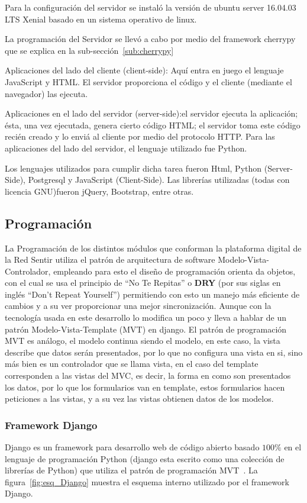 \documentclass[journal,transmag]{IEEEtran}
\begin{document}
Para la configuración del servidor se instaló la versión de ubuntu server 16.04.03 LTS Xenial basado en un sistema operativo de linux.

La programación del Servidor se llevó a cabo por medio del framework cherrypy que se explica en la sub-sección~\ref{sub:cherrypy}

Aplicaciones del lado del cliente (client-side): Aquí entra en juego el lenguaje JavaScript y HTML. El servidor proporciona el código y el cliente (mediante el navegador) las ejecuta. 

Aplicaciones en el lado del servidor (server-side):el servidor ejecuta la aplicación; ésta, una vez ejecutada, genera cierto código HTML; el servidor toma este código recién creado y lo enviá al cliente por medio del protocolo HTTP. Para las aplicaciones del lado del servidor, el lenguaje utilizado fue  Python.

Los lenguajes utilizados para cumplir dicha tarea fueron Html, Python (Server-Side), Postgresql y JavaScript (Client-Side). Las librerías utilizadas (todas con licencia GNU)fueron jQuery, Bootstrap, entre otras.

\subsection{Programación}
La Programación de los distintos módulos que conforman la plataforma digital de la Red Sentir utiliza el patrón de arquitectura de software Modelo-Vista-Controlador, empleando para esto el diseño de programación orienta da objetos, con el cual se usa el principio de ``No Te Repitas'' o \textbf{DRY} (por sus siglas en inglés ``Don't Repeat Yourself'') permitiendo con esto un manejo más eficiente de cambios y a su ver proporcionar una mejor sincronización. Aunque con la tecnología usada en este desarrollo lo modifica un poco y lleva a hablar de un patrón Modelo-Vista-Template (MVT) en django. El patrón de programación MVT es análogo, el modelo continua siendo el modelo, en este caso, la vista describe que datos serán presentados, por lo que no configura una vista en si, sino más bien es un controlador que se llama vista, en el caso del template corresponden a las vistas del MVC, es decir, la forma en como son presentados los datos, por lo que los formularios van en template, estos formularios hacen peticiones a las vistas, y a su vez las vistas obtienen datos de los modelos.

\subsubsection{Framework Django}
Django es un framework para desarrollo web de código abierto basado $100\%$ en el lenguaje de programación Python (django esta escrito como una colección de librerías de Python) que utiliza el patrón de programación MVT~\cite{Hol2009, DjangoM}. La figura~\ref{fig:esq_Django} muestra el esquema interno utilizado por el framework Django.
\end{document}
